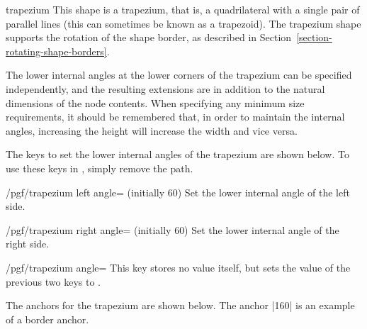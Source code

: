 \begin{shape}{trapezium}
	This shape is a trapezium, that is, a quadrilateral with a single
	pair of parallel lines (this can sometimes be known as a trapezoid).
	The trapezium shape supports the rotation of the shape border, as 
	described in Section~\ref{section-rotating-shape-borders}. 
   
  The lower internal angles at the lower corners of the trapezium can 
  be specified independently, and the resulting extensions are in 
  addition to the natural dimensions of the node contents.
  When specifying any minimum size requirements, it should be 
  remembered that, in order to maintain the internal angles,
  increasing the height will increase the width and vice versa. 

	
\begin{codeexample}[]
\end{codeexample}

         
	The \pgfname{} keys to set the lower internal angles of the trapezium 
	are shown	below. 
	To use these keys in \tikzname, simply remove the  path.
	
	\begin{key}{/pgf/trapezium left angle= (initially 60)}
    Set the lower internal angle of the left side. 
   \end{key}
   
   \begin{key}{/pgf/trapezium right angle= (initially 60)}
    Set the lower internal angle of the right side. 
   \end{key}
   
   \begin{stylekey}{/pgf/trapezium angle=}
    This key stores no value itself, but sets the value of the
    previous two keys to . 
   \end{stylekey}
   
   The anchors for the trapezium are shown below. The anchor |160| is an
	example of a border anchor.


\end{shape}
